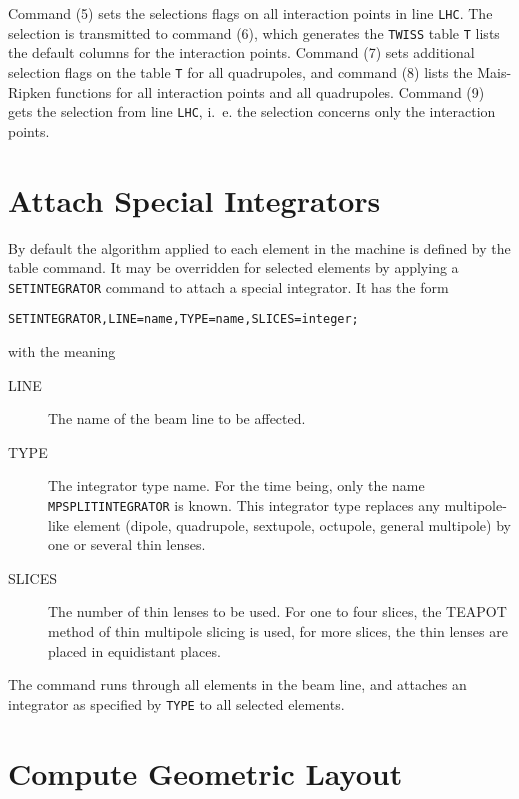 Command (5) sets the selections flags on all interaction points in
line \texttt{LHC}.
The selection is transmitted to command (6), which generates the
\texttt{TWISS} table \texttt{T} lists the default columns for the
interaction points. 
Command (7) sets additional selection flags on the table \texttt{T}
for all quadrupoles,
and command (8) lists the Mais-Ripken functions for all interaction
points and all quadrupoles.
Command (9) gets the selection from line \texttt{LHC}, i.~e. the
selection concerns only the interaction points.

\section{Attach Special Integrators}
\label{sec:setint}

By default the algorithm applied to each element in the machine is
defined by the table command.
It may be overridden for selected elements by applying a \texttt{SETINTEGRATOR}
command to attach a special integrator.
It has the form
\begin{verbatim}
SETINTEGRATOR,LINE=name,TYPE=name,SLICES=integer;
\end{verbatim}
with the meaning
\begin{description}
\item[LINE]
  The name of the beam line to be affected.
\item[TYPE]
  The integrator type name.
  For the time being, only the name \texttt{MPSPLITINTEGRATOR} is
  known.
  This integrator type replaces any multipole-like element (dipole,
  quadrupole, sextupole, octupole, general multipole) by one or
  several thin lenses.
\item[SLICES]
  The number of thin lenses to be used.
  For one to four slices, the TEAPOT method of thin multipole slicing
  is used, for more slices, the thin lenses are placed in equidistant
  places. 
\end{description}
The command runs through all elements in the beam line,
and attaches an integrator as specified by \texttt{TYPE} to all
selected elements.


\section{Compute Geometric Layout}
\label{sec:survey}

